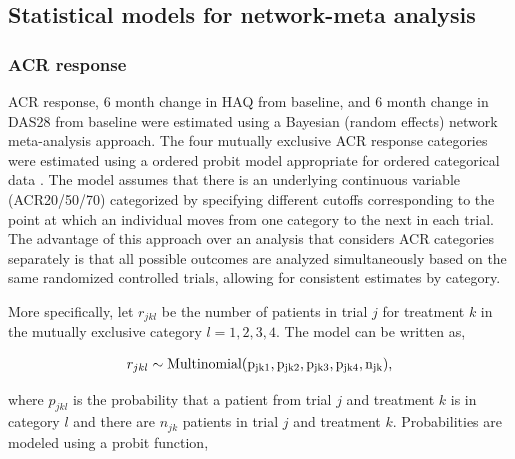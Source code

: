 \documentclass[11pt,final,fleqn]{article}\usepackage[]{graphicx}\usepackage[]{color}
\theoremstyle{plain}
\begin{document}
\begin{appendices}


\subsection{Statistical models for network-meta analysis}\label{app:nma-statistical-models}

\subsubsection{ACR response}
ACR response, 6 month change in HAQ from baseline, and 6 month change in DAS28 from baseline were estimated using a Bayesian (random effects) network meta-analysis approach.  The four mutually exclusive ACR response categories were estimated using a ordered probit model appropriate for ordered categorical data \citep{dias2013evidence}. The model assumes that there is an underlying continuous variable (ACR20/50/70) categorized by specifying different cutoffs corresponding to the point at which an individual moves from one category to the next in each trial. The advantage of this approach over an analysis that considers ACR categories separately is that all possible outcomes are analyzed simultaneously based on the same randomized controlled trials, allowing for consistent estimates by category. 

More specifically, let $r_{jkl}$ be the number of patients in trial $j$ for treatment $k$ in the mutually exclusive category $l = 1,2,3,4$. The model can be written as,

\begin{align}
r_{jkl} \sim \rm{Multinomial}(p_{jk1}, p_{jk2}, p_{jk3}, p_{jk4}, n_{jk}),
\end{align}

where $p_{jkl}$ is the probability that a patient from trial $j$ and treatment $k$ is in category $l$ and there are $n_{jk}$ patients in trial $j$ and treatment $k$. Probabilities are modeled using a probit function,


\end{appendices}
\end{document}
